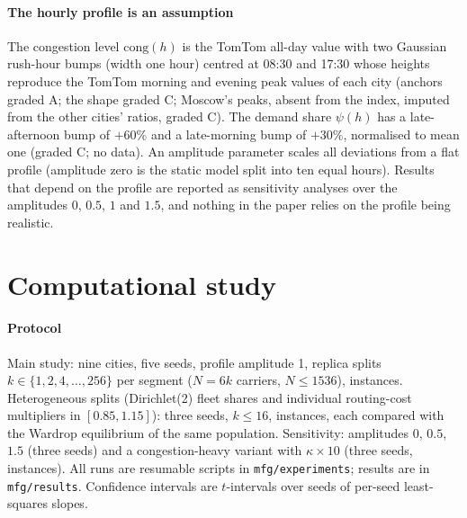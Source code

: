 \documentclass[preprint,11pt,authoryear]{elsarticle}
\theoremstyle{plain}
\theoremstyle{remark}
\begin{document}
\paragraph{The hourly profile is an assumption} The congestion level $\mathrm{cong}(h)$ is the TomTom all-day value with two Gaussian rush-hour bumps (width one hour) centred at 08:30 and 17:30 whose heights reproduce the TomTom morning and evening peak values of each city (anchors graded A; the shape graded C; Moscow's peaks, absent from the index, imputed from the other cities' ratios, graded C). The demand share $\psi(h)$ has a late-afternoon bump of $+60\%$ and a late-morning bump of $+30\%$, normalised to mean one (graded C; no data). An amplitude parameter scales all deviations from a flat profile (amplitude zero is the static model split into ten equal hours). Results that depend on the profile are reported as sensitivity analyses over the amplitudes $0$, $0.5$, $1$ and $1.5$, and nothing in the paper relies on the profile being realistic.



\section{Computational study}\label{sec:exp}

\paragraph{Protocol} Main study: nine cities, five seeds, profile amplitude 1, replica splits $k\in\{1,2,4,\dots,256\}$ per segment ($N=6k$ carriers, $N\le1536$), \NRows{} instances. Heterogeneous splits (Dirichlet(2) fleet shares and individual routing-cost multipliers in $[0.85,1.15]$): three seeds, $k\le16$, \NRowsHet{} instances, each compared with the Wardrop equilibrium of the same population. Sensitivity: amplitudes $0$, $0.5$, $1.5$ (three seeds) and a congestion-heavy variant with $\kappa\times10$ (three seeds, \NRowsK{} instances). All runs are resumable scripts in \texttt{mfg/experiments}; results are in \texttt{mfg/results}. Confidence intervals are $t$-intervals over seeds of per-seed least-squares slopes.
\end{document}
